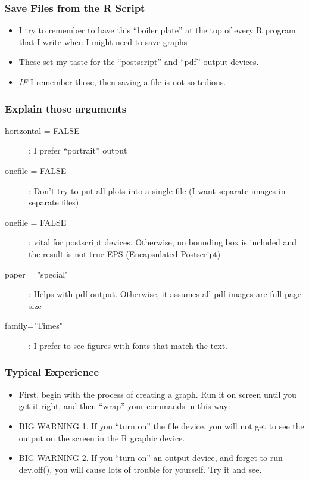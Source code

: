 \documentclass[11pt,english]{beamer}
\begin{document}
\begin{frame}
  \frametitle {Save Files from the R Script}

  \begin{itemize}

    \item I try to remember to have this ``boiler plate'' at the top
      of every R program that I write when I might need to save graphs


    \item These set my taste for the ``postscript'' and ``pdf'' output devices.

    \item \emph{IF} I remember those, then saving a file is not so tedious.
  \end{itemize}
\end{frame}

\begin{frame}
  \frametitle {Explain those arguments}
  \begin{description}
    \item [horizontal = FALSE]: I prefer ``portrait'' output
    \item [onefile = FALSE]: Don't try to put all plots into a single file (I
      want separate images in separate files)
    \item [onefile = FALSE]: vital for postscript devices. Otherwise, no
      bounding box is included and the result is not true EPS  (Encapsulated Postscript)
    \item [paper = "special"]: Helps with pdf output. Otherwise, it
      assumes all pdf images are full page size
    \item [family="Times"]: I prefer to see figures with fonts that
      match the text.
  \end{description}
\end{frame}


\begin{frame}[containsverbatim]
  \frametitle{Typical Experience}
  \begin{itemize}
  \item First, begin with the process of creating a graph. Run it on
    screen until you get it right, and then ``wrap'' your commands
    in this way:



  \item BIG WARNING 1. If you ``turn on'' the file device, you
    will not get to see the output on the screen in the R graphic device.
  \item BIG WARNING 2. If you ``turn on'' an output device, and forget
    to run dev.off(), you will cause lots of trouble for yourself. Try
    it and see.

  \end{itemize}
\end{frame}
\end{document}
